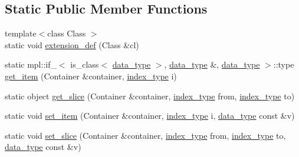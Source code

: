 \subsection*{Static Public Member Functions}
\begin{DoxyCompactItemize}
\item 
{\footnotesize template$<$class Class $>$ }\\static void \hyperlink{classboost_1_1python_1_1std__vector__indexing__suite_a5245748d2887fb696789dd5d3aa789ab}{extension\+\_\+def} (Class \&cl)
\item 
static mpl\+::if\+\_\+$<$ is\+\_\+class$<$ \hyperlink{classboost_1_1python_1_1std__vector__indexing__suite_a9c3db9df25d6966c54154275377c94ce}{data\+\_\+type} $>$, \hyperlink{classboost_1_1python_1_1std__vector__indexing__suite_a9c3db9df25d6966c54154275377c94ce}{data\+\_\+type} \&, \hyperlink{classboost_1_1python_1_1std__vector__indexing__suite_a9c3db9df25d6966c54154275377c94ce}{data\+\_\+type} $>$\+::type \hyperlink{classboost_1_1python_1_1std__vector__indexing__suite_a04e38bebceb369bd5f81f4a7558368bb}{get\+\_\+item} (Container \&container, \hyperlink{classboost_1_1python_1_1std__vector__indexing__suite_a3124827b535a08798fbd33b9fee7b668}{index\+\_\+type} i)
\item 
static object \hyperlink{classboost_1_1python_1_1std__vector__indexing__suite_a4123e6c0c99de706c07b215cb4828e91}{get\+\_\+slice} (Container \&container, \hyperlink{classboost_1_1python_1_1std__vector__indexing__suite_a3124827b535a08798fbd33b9fee7b668}{index\+\_\+type} from, \hyperlink{classboost_1_1python_1_1std__vector__indexing__suite_a3124827b535a08798fbd33b9fee7b668}{index\+\_\+type} to)
\item 
static void \hyperlink{classboost_1_1python_1_1std__vector__indexing__suite_a8093bf206598b549f350eb7ab4d59d8a}{set\+\_\+item} (Container \&container, \hyperlink{classboost_1_1python_1_1std__vector__indexing__suite_a3124827b535a08798fbd33b9fee7b668}{index\+\_\+type} i, \hyperlink{classboost_1_1python_1_1std__vector__indexing__suite_a9c3db9df25d6966c54154275377c94ce}{data\+\_\+type} const \&v)
\item 
static void \hyperlink{classboost_1_1python_1_1std__vector__indexing__suite_a5860806d99df81ed866c00d4af262ab2}{set\+\_\+slice} (Container \&container, \hyperlink{classboost_1_1python_1_1std__vector__indexing__suite_a3124827b535a08798fbd33b9fee7b668}{index\+\_\+type} from, \hyperlink{classboost_1_1python_1_1std__vector__indexing__suite_a3124827b535a08798fbd33b9fee7b668}{index\+\_\+type} to, \hyperlink{classboost_1_1python_1_1std__vector__indexing__suite_a9c3db9df25d6966c54154275377c94ce}{data\+\_\+type} const \&v)

\end{DoxyCompactItemize}
